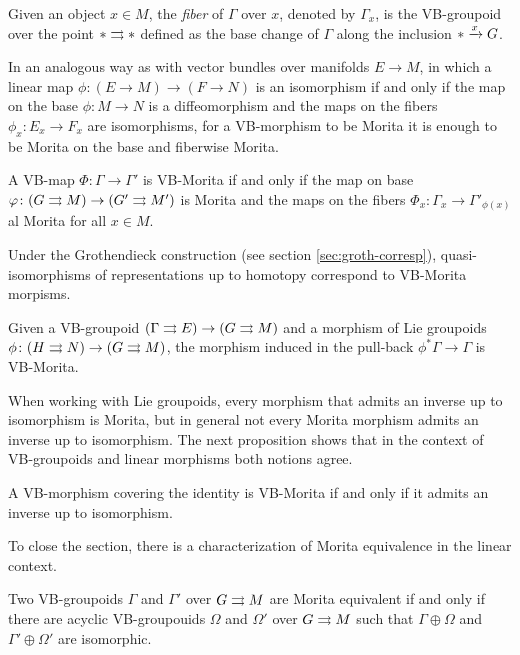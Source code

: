 Given an object $x\in M$, the \emph{fiber} of $\Gamma$ over $x$, denoted by $\Gamma_x$, is the VB-groupoid over the point $*\rightrightarrows *$ defined as the base change of $\Gamma$ along the inclusion $*\xrightarrow{x}G$.

In an analogous way as with vector bundles over manifolds $E\to M$, in which a linear map $\phi\colon(E\to M)\to (F\to N)$ is an isomorphism if and only if the map on the base $\phi\colon M\to N$ is a diffeomorphism and the maps on the fibers $\phi_x\colon E_x\to F_x$ are isomorphisms, for a VB-morphism to be Morita it is enough to be Morita on the base and fiberwise Morita.

\begin{thm}\label{thm:VB-morita}
A VB-map $\Phi\colon\Gamma\to\Gamma'$ is VB-Morita if and only if the map on base $\varphi\colon (G\rightrightarrows M)\to (G'\rightrightarrows M')$ is Morita and the maps on the fibers $\Phi_x\colon \Gamma_x\to\Gamma'_{\phi(x)}$ al Morita for all $x\in M$.
\end{thm}

\begin{coro}\label{cor:quasi-iso}
Under the Grothendieck construction (see section \ref{sec:groth-corresp}), quasi-isomorphisms of representations up to homotopy correspond to VB-Morita morpisms.
\end{coro}

\begin{coro}
Given a VB-groupoid $(\Gamma\rightrightarrows E)\to (G\rightrightarrows M)$ and a morphism of Lie groupoids $\phi\colon (H\rightrightarrows N)\to (G\rightrightarrows M)$, the morphism induced in the pull-back $\phi^*\Gamma\to \Gamma$ is VB-Morita.
\end{coro}

When working with Lie groupoids, every morphism that admits an inverse up to isomorphism is Morita, but in general not every Morita morphism admits an inverse up to isomorphism.
The next proposition shows that in the context of VB-groupoids and linear morphisms both notions agree.

\begin{prop}
A VB-morphism covering the identity is VB-Morita if and only if it admits an inverse up to isomorphism.
\end{prop}

To close the section, there is a characterization of Morita equivalence in the linear context.

\begin{prop}
Two VB-groupoids $\Gamma$ and $\Gamma'$ over $G\rightrightarrows M$ are Morita equivalent if and only if there are acyclic VB-groupouids $\Omega$ and $\Omega'$ over $G\rightrightarrows M$ such that $\Gamma\oplus\Omega$ and $\Gamma'\oplus\Omega'$ are isomorphic.
\end{prop}
